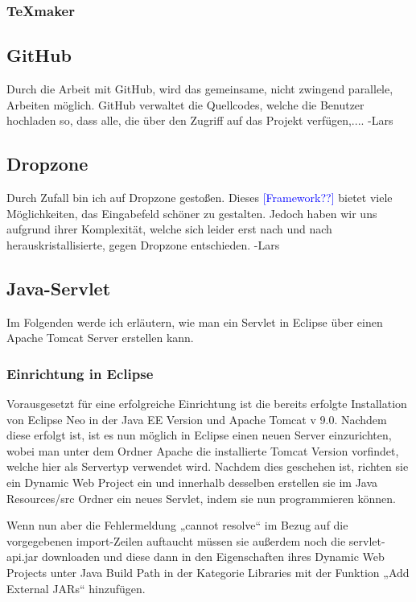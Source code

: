 \documentclass[12pt,a4paper,bibliography=totocnumbered,listof=totocnumbered]{scrartcl}
\begin{document}
\subsubsection{TeXmaker}

\subsection{GitHub}
Durch die Arbeit mit GitHub, wird das gemeinsame, nicht zwingend parallele, Arbeiten möglich.
GitHub verwaltet die Quellcodes, welche die Benutzer hochladen so, dass
alle, die über den Zugriff auf das Projekt verfügen,.... -Lars

\subsection{Dropzone}
Durch Zufall bin ich auf Dropzone gestoßen.
Dieses \textcolor{blue}{[Framework??]} bietet viele Möglichkeiten, 
das Eingabefeld schöner zu gestalten.
Jedoch haben wir uns aufgrund ihrer Komplexität, welche sich leider erst
nach und nach herauskristallisierte, gegen Dropzone entschieden. -Lars

\subsection{Java-Servlet}
Im Folgenden werde ich erläutern, wie man ein Servlet in Eclipse über einen Apache Tomcat Server erstellen kann.

\subsubsection{Einrichtung in Eclipse}
Vorausgesetzt für eine erfolgreiche Einrichtung ist die bereits erfolgte Installation von Eclipse Neo in der Java EE Version und Apache Tomcat v 9.0. 
Nachdem  diese erfolgt ist, ist es nun möglich in Eclipse einen neuen Server einzurichten, wobei man unter dem Ordner Apache die installierte Tomcat Version vorfindet, welche hier  als Servertyp verwendet wird.
Nachdem dies geschehen ist, richten sie ein Dynamic Web Project ein und innerhalb desselben erstellen sie im Java Resources/src  Ordner ein neues Servlet, indem sie nun programmieren können.

Wenn nun aber die Fehlermeldung  „cannot resolve“ im Bezug auf die vorgegebenen import-Zeilen auftaucht müssen sie außerdem noch die servlet-api.jar downloaden und diese dann in den Eigenschaften ihres Dynamic Web Projects unter Java Build Path in der Kategorie Libraries mit der Funktion „Add External JARs“ hinzufügen. 
\end{document}
